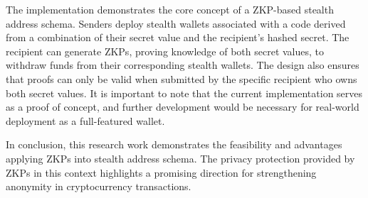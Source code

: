 \documentclass[conference,comsoc,10pt]{IEEEtran}
\begin{document}
    The implementation demonstrates the core concept of a
    ZKP-based stealth address schema. Senders deploy stealth wallets
    associated with a code derived from a combination of their secret value
    and the recipient's hashed secret. The recipient can generate ZKPs,
    proving knowledge of both secret values, to withdraw funds from their
    corresponding stealth wallets. The design also ensures that proofs can
    only be valid when submitted by the specific recipient who owns both
    secret values. It is important to note that the current implementation
    serves as a proof of concept, and further development
    would be necessary for real-world deployment as a full-featured wallet. 

    In conclusion, this research work demonstrates the feasibility and
    advantages applying ZKPs into stealth address schema. The privacy
    protection provided by ZKPs in this context highlights a promising
    direction for strengthening anonymity in cryptocurrency transactions.
\end{document}
